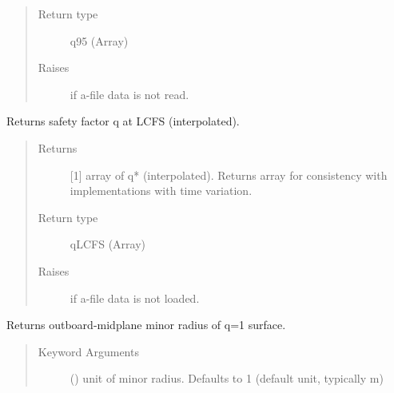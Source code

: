 \documentclass[letterpaper,10pt,english]{sphinxmanual}
\begin{document}
\begin{fulllineitems}
\begin{fulllineitems}
\begin{quote}
\begin{description}
\item[{Return type}] \leavevmode
q95 (Array)

\item[{Raises}] \leavevmode
{} \textendash{} if a-file data is not read.

\end{description}\end{quote}

\end{fulllineitems}


\begin{fulllineitems}
\label{\detokenize{eqtools:eqtools.eqdskreader.EqdskReader.getQLCFS}}
Returns safety factor q at LCFS (interpolated).
\begin{quote}\begin{description}
\item[{Returns}] \leavevmode
{[}1{]} array of q* (interpolated).  Returns array for
consistency with {\hyperref[\detokenize{eqtools:eqtools.core.Equilibrium}]{}}
implementations with time variation.

\item[{Return type}] \leavevmode
qLCFS (Array)

\item[{Raises}] \leavevmode
{} \textendash{} if a-file data is not loaded.

\end{description}\end{quote}

\end{fulllineitems}


\begin{fulllineitems}
\label{\detokenize{eqtools:eqtools.eqdskreader.EqdskReader.getQ1Surf}}
Returns outboard-midplane minor radius of q=1 surface.
\begin{quote}\begin{description}
\item[{Keyword Arguments}] \leavevmode
{} () \textendash{} unit of minor radius.  Defaults to 1
(default unit, typically m)


\end{description}
\end{quote}
\end{fulllineitems}
\end{fulllineitems}
\end{document}
